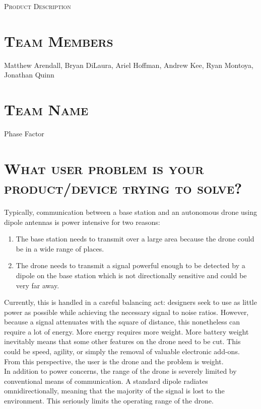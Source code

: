 \documentclass[11pt]{article}
\numberwithin{figure}{section}
\begin{document}
\begin{center}
	\textsc{\Large Product Description}\\
	\hrulefill 
\end{center}

\section{\textsc{Team Members}}
	Matthew Arendall, Bryan DiLaura, Ariel Hoffman, Andrew Kee, Ryan Montoya, Jonathan Quinn
	
\section{\textsc{Team Name}}
	Phase Factor
	
\section{\textsc{What user problem is your product/device trying to solve?}}
	Typically, communication between a base station and an autonomous drone using dipole antennas is power intensive for two reasons: 
	\begin{enumerate}
		\item The base station needs to transmit over a large area because the drone could be in a wide range of places.
		\item The drone needs to transmit a signal powerful enough to be detected by a dipole on the base station which is not directionally sensitive and could be very far away.
	\end{enumerate}
	Currently, this is handled in a careful balancing act: designers seek to use as little power as possible while achieving the necessary signal to noise ratios. However, because a signal attenuates with the square of distance, this nonetheless can require a lot of energy.  More energy requires more weight. More battery weight inevitably means that some other features on the drone need to be cut. This could be speed, agility, or simply the removal of valuable electronic add-ons. From this perspective, the user is the drone and the problem is weight. \\
	
	In addition to power concerns, the range of the drone is severely limited by conventional means of communication.  A standard dipole radiates omnidirectionally, meaning that the majority of the signal is lost to the environment.  This seriously limits the operating range of the drone.  \\
	
\end{document}
